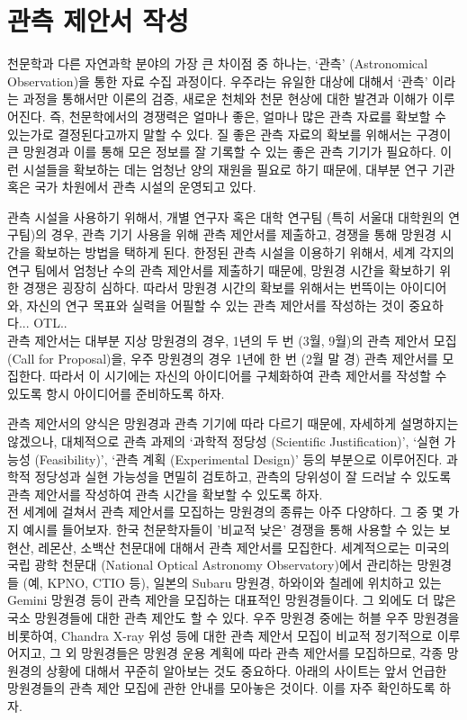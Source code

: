 \section{관측 제안서 작성}
천문학과 다른 자연과학 분야의 가장 큰 차이점 중 하나는, ‘관측’ (Astronomical
Observation)을 통한 자료 수집 과정이다. 우주라는 유일한 대상에 대해서 ‘관측’
이라는 과정을 통해서만 이론의 검증, 새로운 천체와 천문 현상에 대한 발견과 이해가
이루어진다. 즉, 천문학에서의 경쟁력은 얼마나 좋은, 얼마나 많은 관측 자료를 확보할
수 있는가로 결정된다고까지 말할 수 있다. 질 좋은 관측 자료의 확보를 위해서는
구경이 큰 망원경과 이를 통해 모은 정보를 잘 기록할 수 있는 좋은 관측 기기가
필요하다. 이런 시설들을 확보하는 데는 엄청난 양의 재원을 필요로 하기 때문에,
대부분 연구 기관 혹은 국가 차원에서 관측 시설의 운영되고 있다.

관측 시설을 사용하기 위해서, 개별 연구자 혹은 대학 연구팀 (특히 서울대 대학원의 연구팀)의 경우, 관측 기기 사용을 위해 관측 제안서를 제출하고, 경쟁을 통해 망원경 시간을 확보하는 방법을 택하게 된다. 한정된 관측 시설을 이용하기 위해서, 세계 각지의 연구 팀에서 엄청난 수의 관측 제안서를 제출하기 때문에, 망원경 시간을 확보하기 위한 경쟁은 굉장히 심하다. 따라서 망원경 시간의 확보를 위해서는 번뜩이는 아이디어와, 자신의 연구 목표와 실력을 어필할 수 있는 관측 제안서를 작성하는 것이 중요하다... OTL..\\

관측 제안서는 대부분 지상 망원경의 경우, 1년의 두 번 (3월, 9월)의 관측 제안서
모집 (Call for Proposal)을, 우주 망원경의 경우 1년에 한 번 (2월 말 경) 관측
제안서를 모집한다. 따라서 이 시기에는 자신의 아이디어를 구체화하여 관측 제안서를
작성할 수 있도록 항시 아이디어를 준비하도록 하자.

관측 제안서의 양식은 망원경과 관측 기기에 따라 다르기 때문에, 자세하게 설명하지는 않겠으나, 대체적으로 관측 과제의 ‘과학적 정당성 (Scientific Justification)’, ‘실현 가능성 (Feasibility)’, ‘관측 계획 (Experimental Design)’ 등의 부분으로 이루어진다. 과학적 정당성과 실현 가능성을 면밀히 검토하고, 관측의 당위성이 잘 드러날 수 있도록 관측 제안서를 작성하여 관측 시간을 확보할 수 있도록 하자.\\

전 세계에 걸쳐서 관측 제안서를 모집하는 망원경의 종류는 아주 다양하다. 그 중 몇
가지 예시를 들어보자. 한국 천문학자들이 '비교적 낮은' 경쟁을 통해 사용할 수 있는
보현산, 레몬산, 소백산 천문대에 대해서 관측 제안서를 모집한다. 세계적으로는
미국의 국립 광학 천문대 (National Optical Astronomy Observatory)에서 관리하는
망원경들 (예, KPNO, CTIO 등), 일본의 Subaru 망원경, 하와이와 칠레에 위치하고 있는
Gemini 망원경 등이 관측 제안을 모집하는 대표적인 망원경들이다. 그 외에도 더 많은
국소 망원경들에 대한 관측 제안도 할 수 있다. 우주 망원경 중에는 허블 우주
망원경을 비롯하여, Chandra X-ray 위성 등에 대한 관측 제안서 모집이 비교적
정기적으로 이루어지고, 그 외 망원경들은 망원경 운용 계획에 따라 관측 제안서를
모집하므로, 각종 망원경의 상황에 대해서 꾸준히 알아보는 것도 중요하다. 아래의
사이트는 앞서 언급한 망원경들의 관측 제안 모집에 관한 안내를 모아놓은
것이다. 이를 자주 확인하도록 하자.

